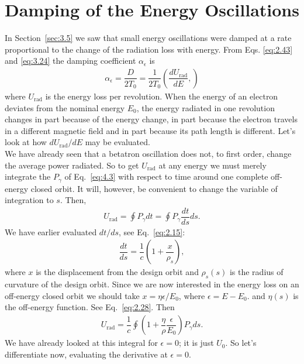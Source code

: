 \section{Damping of the Energy Oscillations}\label{sec:4.2}

In Section~\ref{sec:3.5} we saw that small energy oscillations were damped at a rate proportional
 to the change of the radiation loss with energy. From Eqs. \eqref{eq:2.43} and \eqref{eq:3.24} the damping coefficient $\alpha_\epsilon$ is
\begin{align}
	\alpha_\epsilon = \dfrac{D}{2 T_0} = \dfrac{1}{2 T_0} \left( \dfrac{d U_\text{rad}}{d E}, \right)
\end{align}
where $U_\text{rad}$ is the energy loss per revolution. When the energy of an electron deviates from the nominal energy $E_0$, the energy radiated in one revolution changes in part because of the energy change, in part because the electron travels in a different magnetic field and in part because its path length is different. Let’s look at how $dU_\text{rad}/dE$ may be evaluated.\\
We have already seen that a betatron oscillation does not, to first order, change the average power radiated. So to get $U_\text{rad}$ at any energy we must merely integrate the $P_\gamma$ of Eq.~\eqref{eq:4.3} with respect to time around one complete off-energy closed orbit. It will, however, be convenient to change the variable of integration to $s$. Then,
\begin{align}
	U_\text{rad} = \oint P_\gamma dt = \oint P_\gamma \dfrac{dt}{ds} ds.
\end{align}
We have earlier evaluated $dt/ds$, see Eq.~\eqref{eq:2.15}:
\begin{align*}
	\dfrac{dt}{ds} = \dfrac{1}{c} \left( 1 + \dfrac{x}{\rho_s} \right),
\end{align*}
where $x$ is the displacement from the design orbit and $\rho_s(s)$ is the radius of curvature of the design orbit. Since we are now interested in the energy loss on an off-energy closed orbit we should take $x = \eta \epsilon/E_0$, where $\epsilon = E - E_0$. and $\eta(s)$ is
the off-energy function. See Eq.~\eqref{eq:2.28}. Then
\begin{align}
	U_\text{rad} = \dfrac{1}{c} \oint \left( 1 + \dfrac{\eta}{\rho} \dfrac{\epsilon}{E_0} \right) P_\gamma ds.
\end{align}
We have already looked at this integral for $\epsilon = 0$; it is just $U_0$. So let’s differentiate now, evaluating the derivative at $\epsilon = 0$.
